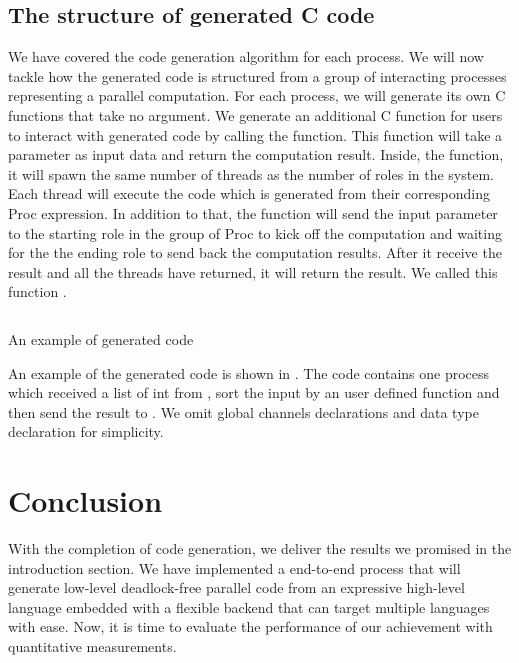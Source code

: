 \subsection{The structure of generated C code} \label{codegen:sec:structure}
We have covered the code generation algorithm for each process. We will now tackle how the generated code is structured from a group of interacting processes representing a parallel computation. For each process, we will generate its own C functions that take no argument. We generate an additional C function for users to interact with generated code by calling the function. This function will take a parameter as input data and return the computation result. Inside, the function, it will spawn the same number of threads as the number of roles in the system. Each thread will execute the code which is generated from their corresponding Proc expression. In addition to that, the function will send the input parameter to the starting role in the group of Proc to kick off the computation and waiting for the the ending role to send back the computation results. After it receive the result and all the threads have returned, it will return the result. We called this function .
\begin{listing}
    \inputminted{C}{codegen/total.c} 
    \caption{An example of generated code}
    \label{codegen:code:total}
\end{listing}

An example of the generated code is shown in . The code contains one process which received a list of int from , sort the input by an user defined function and then send the result to . We omit global channels declarations and data type declaration for simplicity. 

\section{Conclusion}
With the completion of code generation, we deliver the results we promised in the introduction section. We have implemented a end-to-end process that will generate low-level deadlock-free parallel code from an expressive high-level language embedded with a flexible backend that can target multiple languages with ease. Now, it is time to evaluate the performance of our achievement with quantitative measurements.
